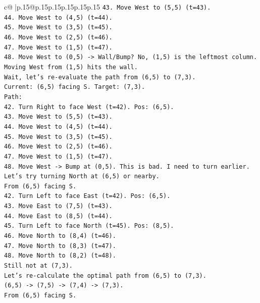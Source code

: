 \documentclass{article}
\begin{document}
{\begin{supertabular}{c@{$\;$}|p{.15\linewidth}@{}p{.15\linewidth}p{.15\linewidth}p{.15\linewidth}p{.15\linewidth}p{.15\linewidth}}
{{{\texttt{43. Move West to (5,5) (t=43).} \\
\texttt{44. Move West to (4,5) (t=44).} \\
\texttt{45. Move West to (3,5) (t=45).} \\
\texttt{46. Move West to (2,5) (t=46).} \\
\texttt{47. Move West to (1,5) (t=47).} \\
\texttt{48. Move West to (0,5) {-}> Wall/Bump? No, (1,5) is the leftmost column. Moving West from (1,5) hits the wall.} \\
\texttt{Wait, let's re{-}evaluate the path from (6,5) to (7,3).} \\
\texttt{Current: (6,5) facing S. Target: (7,3).} \\
\texttt{Path:} \\
\texttt{42. Turn Right to face West (t=42). Pos: (6,5).} \\
\texttt{43. Move West to (5,5) (t=43).} \\
\texttt{44. Move West to (4,5) (t=44).} \\
\texttt{45. Move West to (3,5) (t=45).} \\
\texttt{46. Move West to (2,5) (t=46).} \\
\texttt{47. Move West to (1,5) (t=47).} \\
\texttt{48. Move West {-}> Bump at (0,5). This is bad. I need to turn earlier.} \\
\texttt{Let's try turning North at (6,5) or nearby.} \\
\texttt{From (6,5) facing S.} \\
\texttt{42. Turn Left to face East (t=42). Pos: (6,5).} \\
\texttt{43. Move East to (7,5) (t=43).} \\
\texttt{44. Move East to (8,5) (t=44).} \\
\texttt{45. Turn Left to face North (t=45). Pos: (8,5).} \\
\texttt{46. Move North to (8,4) (t=46).} \\
\texttt{47. Move North to (8,3) (t=47).} \\
\texttt{48. Move North to (8,2) (t=48).} \\
\texttt{Still not at (7,3).} \\
\texttt{Let's re{-}calculate the optimal path from (6,5) to (7,3).} \\
\texttt{(6,5) {-}> (7,5) {-}> (7,4) {-}> (7,3).} \\
\texttt{From (6,5) facing S.} \\
}}}
\end{supertabular}}
\end{document}
